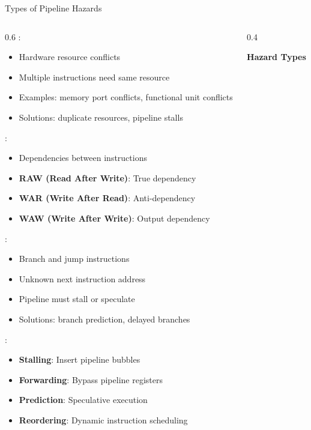\begin{frame}{Types of Pipeline Hazards}
\begin{columns}
\begin{column}{0.6\textwidth}
:
\begin{itemize}
\item Hardware resource conflicts
\item Multiple instructions need same resource
\item Examples: memory port conflicts, functional unit conflicts
\item Solutions: duplicate resources, pipeline stalls
\end{itemize}

\vspace{0.3cm}
:
\begin{itemize}
\item Dependencies between instructions
\item \textbf{RAW (Read After Write)}: True dependency
\item \textbf{WAR (Write After Read)}: Anti-dependency
\item \textbf{WAW (Write After Write)}: Output dependency
\end{itemize}

\vspace{0.3cm}
:
\begin{itemize}
\item Branch and jump instructions
\item Unknown next instruction address
\item Pipeline must stall or speculate
\item Solutions: branch prediction, delayed branches
\end{itemize}

\vspace{0.3cm}
:
\begin{itemize}
\item \textbf{Stalling}: Insert pipeline bubbles
\item \textbf{Forwarding}: Bypass pipeline registers
\item \textbf{Prediction}: Speculative execution
\item \textbf{Reordering}: Dynamic instruction scheduling
\end{itemize}
\end{column}
\begin{column}{0.4\textwidth}
\begin{center}
\textbf{Hazard Types}
\vspace{0.3cm}


\end{center}
\end{column}
\end{columns}
\end{frame}
